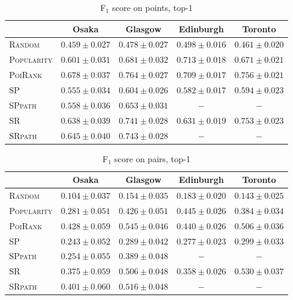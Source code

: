 \begin{table*}[t]
\caption{F$_1$ score on points, top-1}
\label{tab:f1}
\centering
\begin{tabular}{l|cccc} \hline
 & Osaka & Glasgow & Edinburgh & Toronto \\ \hline
\textsc{Random} & $0.459\pm0.027$ & $0.478\pm0.027$ & $0.498\pm0.016$ & $0.461\pm0.020$ \\
\textsc{Popularity} & $0.601\pm0.031$ & $0.681\pm0.032$ & $\mathbf{0.713\pm0.018}$ & $0.671\pm0.021$ \\
\textsc{PoiRank} & $\mathbf{0.678\pm0.037}$ & $\mathbf{0.764\pm0.027}$ & $\mathit{0.709\pm0.017}$ & $\mathbf{0.756\pm0.021}$ \\
\textsc{SP} & $0.555\pm0.034$ & $0.604\pm0.026$ & $0.582\pm0.017$ & $0.594\pm0.023$ \\
\textsc{SPpath} & $0.558\pm0.036$ & $0.653\pm0.031$ & $-$ & $-$ \\
\textsc{SR} & $0.638\pm0.039$ & $0.741\pm0.028$ & $0.631\pm0.019$ & $\mathit{0.753\pm0.023}$ \\
\textsc{SRpath} & $\mathit{0.645\pm0.040}$ & $\mathit{0.743\pm0.028}$ & $-$ & $-$ \\
\hline
\end{tabular}
\end{table*}


\begin{table*}[t]
\caption{F$_1$ score on pairs, top-1}
\label{tab:pf1}
\centering
\begin{tabular}{l|cccc} \hline
 & Osaka & Glasgow & Edinburgh & Toronto \\ \hline
\textsc{Random} & $0.104\pm0.037$ & $0.154\pm0.035$ & $0.183\pm0.020$ & $0.143\pm0.025$ \\
\textsc{Popularity} & $0.281\pm0.051$ & $0.426\pm0.051$ & $\mathbf{0.445\pm0.026}$ & $0.384\pm0.034$ \\
\textsc{PoiRank} & $\mathbf{0.428\pm0.059}$ & $\mathbf{0.545\pm0.046}$ & $\mathit{0.440\pm0.026}$ & $\mathit{0.506\pm0.036}$ \\
\textsc{SP} & $0.243\pm0.052$ & $0.289\pm0.042$ & $0.277\pm0.023$ & $0.299\pm0.033$ \\
\textsc{SPpath} & $0.254\pm0.055$ & $0.389\pm0.048$ & $-$ & $-$ \\
\textsc{SR} & $0.375\pm0.059$ & $0.506\pm0.048$ & $0.358\pm0.026$ & $\mathbf{0.530\pm0.037}$ \\
\textsc{SRpath} & $\mathit{0.401\pm0.060}$ & $\mathit{0.516\pm0.048}$ & $-$ & $-$ \\
\hline
\end{tabular}
\end{table*}


